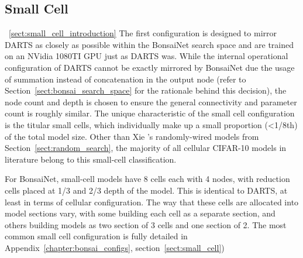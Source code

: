 
\graphicspath{{Chapters/appendix_bonsai/figures/}}

\subsection{Small Cell}~\ref{sect:small_cell_introduction}
The first configuration is designed to mirror DARTS as closely as
possible within the BonsaiNet search space and are trained on an NVidia 1080TI GPU just as DARTS was. While the internal
operational configuration of DARTS cannot be exactly mirrored
by BonsaiNet due the usage of summation instead of concatenation in the output node (refer to Section~\ref{sect:bonsai_search_space} for
the rationale behind this decision), the node count and depth is chosen
to ensure the general connectivity and parameter count is roughly similar. The unique characteristic of the small
cell configuration is the titular small cells, which individually make up a small proportion (<1/8th) of the
total model size. Other than
Xie \etal's randomly-wired models from Section~\ref{sect:random_search}, the majority of all cellular CIFAR-10 models
in literature belong to this small-cell classification.

For BonsaiNet, small-cell models have 8 cells each with 4 nodes, with reduction cells placed at 1/3 and 2/3 depth of
the model. This is identical to DARTS\cite{liu2018},
at least in terms of cellular configuration. The way that these cells are allocated into model sections vary, with some building
each cell as a separate section, and others building models as two section of 3 cells and one section of 2. The most
common small cell configuration is fully detailed in Appendix~\ref{chapter:bonsai_configs}, section~\ref{sect:small_cell})

